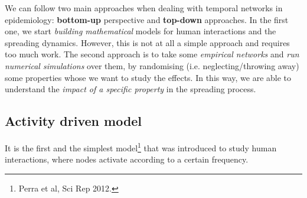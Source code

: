 \documentclass[../main/main.tex]{subfiles}
\begin{document}
We can follow two main approaches when dealing with temporal networks in epidemiology: \textbf{bottom-up} perspective and \textbf{top-down} approaches.
In the first one, we start \textit{building mathematical} models for human interactions and the spreading dynamics. However, this is not at all a simple approach and requires too much work. The second approach is to take some \textit{empirical networks} and \textit{run numerical simulations} over them, by randomising (i.e. neglecting/throwing away) some properties whose we want to study the effects. In this way, we are able to understand the \textit{impact of a specific property} in the spreading process.



\subsection{Activity driven model}

It is the first and the simplest model\footnote{Perra et al, Sci Rep 2012.} that was introduced to study human interactions, where nodes activate according to a certain frequency.

\end{document}
